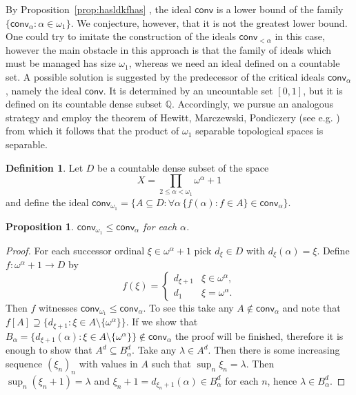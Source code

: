 \documentclass{amsart}
\theoremstyle{plain}
\newtheorem{proposition}[theorem]{Proposition}
\theoremstyle{definition}
\newtheorem{definition}[theorem]{Definition}
\theoremstyle{remark}
\newcommand{\bQ}{\mathbb{Q}}
\newcommand{\Q}{\bQ}
\newcommand{\conv}{\mathsf{conv}}
\renewcommand{\subset}{\subseteq}
\renewcommand{\supset}{\supseteq}
\begin{document}
 
By Proposition~\ref{prop:hasldkfhas}
, the ideal $\conv$ is a lower bound of the family $\{\conv_\alpha : \alpha\in\omega_1\}$. We conjecture, however, that it is not the greatest lower bound. One could try to imitate the construction of the ideals $\conv_{<\alpha}$ in this case, however the main obstacle in this approach  
is that the family  of ideals which must be managed  has size $\omega_1$, whereas we  need an ideal defined on a countable set. A possible solution is suggested by the predecessor of the critical ideals $\conv_\alpha$, namely the ideal $\conv$. It is determined by an uncountable set $[0,1]$, but it is defined on its countable dense subset $\Q$. Accordingly, we pursue an analogous strategy and employ the theorem of Hewitt, Marczewski, Pondiczery (see e.g. \cite[Theorem
2.3.15]{MR1039321}) from  which it follows that the product of $\omega_1$ separable topological spaces is separable.   

\begin{definition}
    Let $D$ be a countable dense subset of the space 
    $$X = \prod_{2\leq \alpha < \omega_1} \omega^\alpha+1$$ and define the ideal
    $\conv_{\omega_1}=\{A\subset D: \forall \alpha\, \{f(\alpha) : f\in A\}\in\conv_\alpha\}.$
\end{definition}

\begin{proposition}
    $\conv_{\omega_1}\leq\conv_\alpha$ for each $\alpha$.
\end{proposition}
\begin{proof}
For each successor ordinal $\xi\in\omega^\alpha+1$ pick $d_\xi\in D$ with $d_\xi(\alpha)=\xi$. Define $f:\omega^\alpha+1\to D$ by 
\begin{equation*}
f(\xi) =
\begin{cases}
d_{\xi+1} & \xi \in \omega^\alpha,\\
d_1&  \xi= \omega^\alpha.
    \end{cases}
\end{equation*}
Then $f$ witnesses $\conv_{\omega_1}\leq\conv_\alpha$. To see this take any $A\notin\conv_\alpha$ and note that $f[A]\supset\{d_{\xi+1} : \xi\in A\setminus\{\omega^\alpha\}\}$. If we show that $B_\alpha=\{d_{\xi+1}(\alpha):\xi \in A\setminus\{\omega^\alpha\}\}\notin\conv_\alpha$ the proof will be finished, therefore it is enough to show that $A^d\subset B^d_\alpha$. Take any $\lambda\in A^d$. Then there is some increasing sequence $(\xi_n)_n$ with values in $A$ such that $\sup_n\xi_n=\lambda $. Then $\sup_n(\xi_n+1)=\lambda$ and $\xi_n+1=d_{\xi_n+1}(\alpha)\in B^d_\alpha $ for each $n$, hence $\lambda\in B^d_\alpha$. 
\end{proof}
\end{document}
